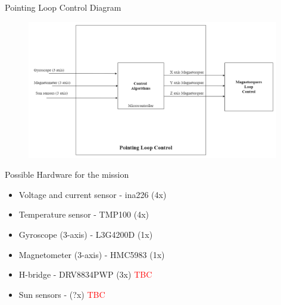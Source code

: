\documentclass{beamer}
\begin{document}
\begin{frame}{Pointing Loop Control Diagram}

    \begin{figure}[!ht]
        \begin{center}
            \includegraphics[width=11cm]{figures/Malha_Pointing.drawio.png}
        \end{center}
    \end{figure}

\end{frame}

\begin{frame}{Possible Hardware for the mission}

    \begin{itemize}
        \item Voltage and current sensor - ina226 (4x) 
        \item Temperature sensor - TMP100 (4x)
        \item Gyroscope (3-axis) - L3G4200D (1x)
        \item Magnetometer (3-axis) - HMC5983 (1x)
        \item H-bridge - DRV8834PWP (3x) \textcolor{red}{TBC}
        \item Sun sensors - (?x) \textcolor{red}{TBC}
    \end{itemize}

\end{frame}

\end{document}
